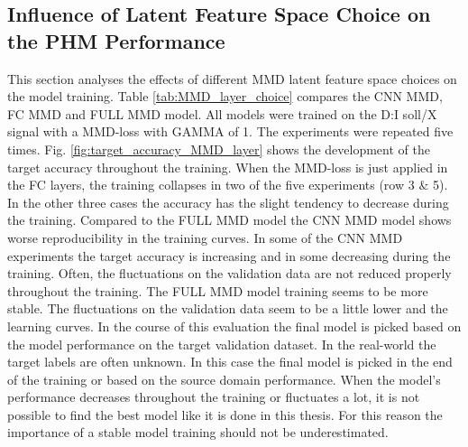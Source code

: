 \subsection{Influence of Latent Feature Space Choice on the PHM Performance}\label{ch:Influence_Layer_real_dataset}
This section analyses the effects of different MMD latent feature space choices on the model training. Table \ref{tab:MMD_layer_choice} compares the CNN MMD, FC MMD and FULL MMD model. All models were trained on the D:I soll/X signal with a MMD-loss with GAMMA of 1. The experiments were repeated five times. Fig. \ref{fig:target_accuracy_MMD_layer} shows the development of the target accuracy throughout the training. When the MMD-loss is just applied in the FC layers, the training collapses in two of the five experiments (row 3 $\&$ 5). In the other three cases the accuracy has the slight tendency to decrease during the training. Compared to the FULL MMD model the CNN MMD model shows worse reproducibility in the training curves. In some of the CNN MMD experiments the target accuracy is increasing and in some decreasing during the training. Often, the fluctuations on the validation data are not reduced properly throughout the training. The FULL MMD model training seems to be more stable. The fluctuations on the validation data seem to be a little lower and the learning curves. In the course of this evaluation the final model is picked based on the model performance on the target validation dataset. In the real-world the target labels are often unknown. In this case the final model is picked in the end of the training or based on the source domain performance. When the model's performance decreases throughout the training or fluctuates a lot, it is not possible to find the best model like it is done in this thesis. For this reason the importance of a stable model training should not be underestimated. 

